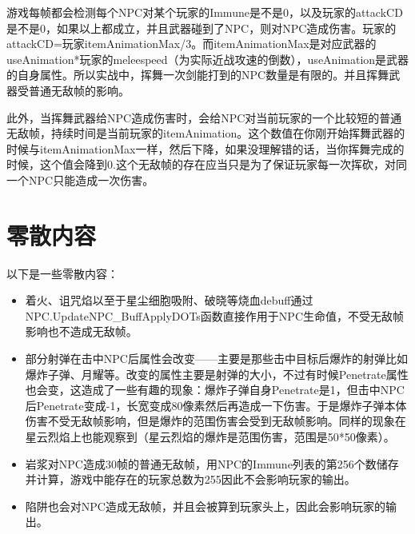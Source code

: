 游戏每帧都会检测每个NPC对某个玩家的Immune是不是0，以及玩家的attackCD是不是0，如果以上都成立，并且武器碰到了NPC，则对NPC造成伤害。玩家的attackCD=玩家itemAnimationMax/3。而itemAnimationMax是对应武器的useAnimation*玩家的meleespeed（为实际近战攻速的倒数），useAnimation是武器的自身属性。所以实战中，挥舞一次剑能打到的NPC数量是有限的。并且挥舞武器受普通无敌帧的影响。

此外，当挥舞武器给NPC造成伤害时，会给NPC对当前玩家的一个比较短的普通无敌帧，持续时间是当前玩家的itemAnimation。这个数值在你刚开始挥舞武器的时候与itemAnimationMax一样，然后下降，如果没理解错的话，当你挥舞完成的时候，这个值会降到0.这个无敌帧的存在应当只是为了保证玩家每一次挥砍，对同一个NPC只能造成一次伤害。

\section{零散内容}

以下是一些零散内容：

\begin{itemize}
\item 着火、诅咒焰以至于星尘细胞吸附、破晓等烧血debuff通过NPC.UpdateNPC_BuffApplyDOTs函数直接作用于NPC生命值，不受无敌帧影响也不造成无敌帧。
\item 部分射弹在击中NPC后属性会改变——主要是那些击中目标后爆炸的射弹比如爆炸子弹、月耀等。改变的属性主要是射弹的大小，不过有时候Penetrate属性也会变，这造成了一些有趣的现象：爆炸子弹自身Penetrate是1，但击中NPC后Penetrate变成-1，长宽变成80像素然后再造成一下伤害。于是爆炸子弹本体伤害不受无敌帧影响，但是爆炸的范围伤害会受到无敌帧影响。同样的现象在星云烈焰上也能观察到（星云烈焰的爆炸是范围伤害，范围是50*50像素）。
\item 岩浆对NPC造成30帧的普通无敌帧，用NPC的Immune列表的第256个数储存并计算，游戏中能存在的玩家总数为255因此不会影响玩家的输出。
\item 陷阱也会对NPC造成无敌帧，并且会被算到玩家头上，因此会影响玩家的输出。
\end{itemize}